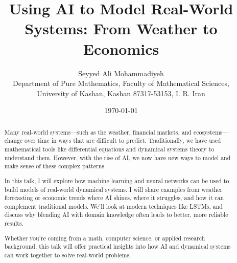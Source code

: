 \documentclass[12pt]{article}
\title{Using AI to Model Real-World Systems: From Weather to Economics}
\author{Seyyed Ali Mohammadiyeh \\ Department of Pure Mathematics, Faculty of Mathematical Sciences, \\ University of Kashan, Kashan 87317-53153, I. R. Iran}
\date{\today}
\begin{document}
	
	\maketitle
	
	\begin{abstract}
		Many real-world systems—such as the weather, financial markets, and ecosystems—change over time in ways that are difficult to predict. Traditionally, we have used mathematical tools like differential equations and dynamical systems theory to understand them. However, with the rise of AI, we now have new ways to model and make sense of these complex patterns.
		
		In this talk, I will explore how machine learning and neural networks can be used to build models of real-world dynamical systems. I will share examples from weather forecasting or economic trends where AI shines, where it struggles, and how it can complement traditional models. We’ll look at modern techniques like LSTMs,
		and discuss why blending AI with domain knowledge often leads to better, more reliable results.
		
		Whether you're coming from a math, computer science, or applied research background, this talk will offer practical insights into how AI and dynamical systems can work together to solve real-world problems.
	\end{abstract}
	
\end{document}
